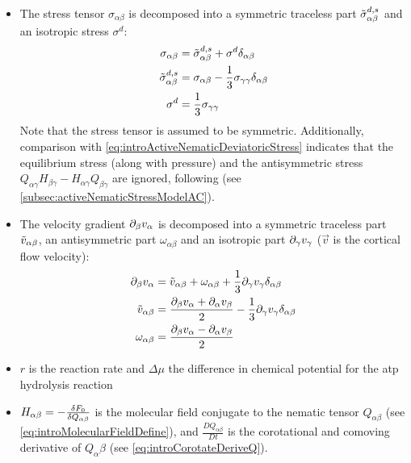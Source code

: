 \begin{itemize}
    \item The stress tensor $\sigma_{\alpha\beta}$ is decomposed into a symmetric traceless part $\Tilde{\sigma}^{d,s}_{\alpha\beta}$ and an isotropic stress $\sigma^d$:
    \begin{align*}
        \sigma_{\alpha\beta} &= \Tilde{\sigma}^{d,s}_{\alpha\beta} + \sigma^d\delta_{\alpha\beta}\\
        \Tilde{\sigma}^{d,s}_{\alpha\beta} &= \sigma_{\alpha\beta} - \frac{1}{3}\sigma_{\gamma\gamma}\delta_{\alpha\beta}\\
        \sigma^d &= \frac{1}{3}\sigma_{\gamma\gamma}
    \end{align*}
    Note that the stress tensor is assumed to be symmetric. Additionally, comparison with \autoref{eq:introActiveNematicDeviatoricStress} indicates that the equilibrium stress (along with pressure) and the antisymmetric stress $Q_{\alpha\gamma}H_{\beta\gamma} - H_{\alpha\gamma}Q_{\beta\gamma}$ are ignored, following \cite{reymann2016cortical} (see \autoref{subsec:activeNematicStressModelAC}). 
    \item The velocity gradient $\inlinePartial{\beta}{v_\alpha}$ is decomposed into a symmetric traceless part $\Tilde{v}_{\alpha\beta}$, an antisymmetric part $\omega_{\alpha\beta}$ and an isotropic part $\inlinePartial{\gamma}{v_\gamma}$ ($\vec{v}$ is the cortical flow velocity):
    \begin{align*}
        \inlinePartial{\beta}{v_\alpha} &= \Tilde{v}_{\alpha\beta} + \omega_{\alpha\beta} + \frac{1}{3}\inlinePartial{\gamma}{v_\gamma}\delta_{\alpha\beta}\\
        \Tilde{v}_{\alpha\beta} &= \frac{\inlinePartial{\beta}{v_\alpha} + \inlinePartial{\alpha}{v_\beta}}{2} - \frac{1}{3}\inlinePartial{\gamma}{v_\gamma}\delta_{\alpha\beta}\\
        \omega_{\alpha\beta} &= \frac{\inlinePartial{\beta}{v_\alpha} - \inlinePartial{\alpha}{v_\beta}}{2}
    \end{align*}
    \item $r$ is the reaction rate and $\Delta\mu$ the difference in chemical potential for the \ac{atp} hydrolysis reaction
    \item $H_{\alpha\beta} = -\fdv{F_0}{Q_{\alpha\beta}}$ is the molecular field conjugate to the nematic tensor $Q_{\alpha\beta}$ (see \autoref{eq:introMolecularFieldDefine}), and $\frac{DQ_{\alpha\beta}}{Dt}$ is the corotational and comoving derivative of $Q_{\alpha}{\beta}$ (see \autoref{eq:introCorotateDeriveQ}).
\end{itemize}

